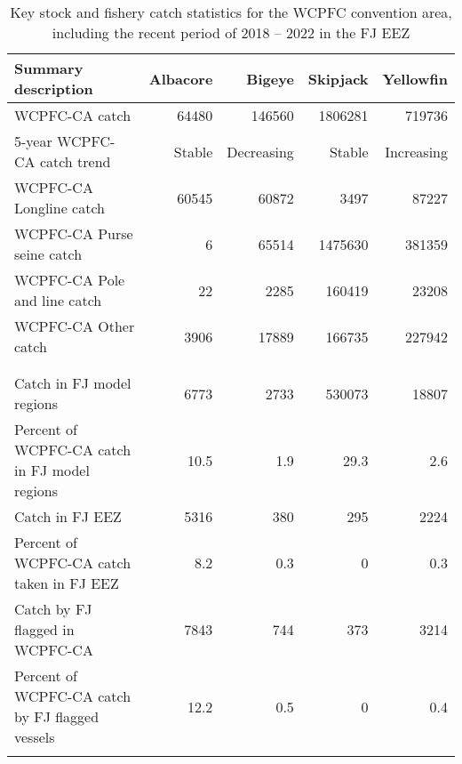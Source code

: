 \begin{longtable}{lrrrr}
\caption{Key stock and fishery catch statistics for the WCPFC convention area, including the recent period of 2018 -- 2022 in the FJ EEZ} \\ 
  \hline
Summary description & Albacore & Bigeye & Skipjack & Yellowfin \\ 
  \hline
WCPFC-CA catch & 64480 & 146560 & 1806281 & 719736 \\ 
  5-year WCPFC-CA catch trend & Stable & Decreasing & Stable & Increasing \\ 
  WCPFC-CA Longline catch & 60545 & 60872 & 3497 & 87227 \\ 
  WCPFC-CA Purse seine catch & 6 & 65514 & 1475630 & 381359 \\ 
  WCPFC-CA Pole and line catch & 22 & 2285 & 160419 & 23208 \\ 
  WCPFC-CA Other catch & 3906 & 17889 & 166735 & 227942 \\ 
   &  &  &  &  \\ 
   \hline
 &  &  &  &  \\ 
  Catch in FJ model regions & 6773 & 2733 & 530073 & 18807 \\ 
  Percent of WCPFC-CA catch in FJ model regions & 10.5 & 1.9 & 29.3 & 2.6 \\ 
  Catch in FJ EEZ & 5316 & 380 & 295 & 2224 \\ 
  Percent of WCPFC-CA catch taken in FJ EEZ & 8.2 & 0.3 & 0 & 0.3 \\ 
  Catch by FJ flagged in WCPFC-CA & 7843 & 744 & 373 & 3214 \\ 
  Percent of WCPFC-CA catch by FJ flagged vessels & 12.2 & 0.5 & 0 & 0.4 \\ 
  \hline
\label{cat_sum_tab}
\end{longtable}

